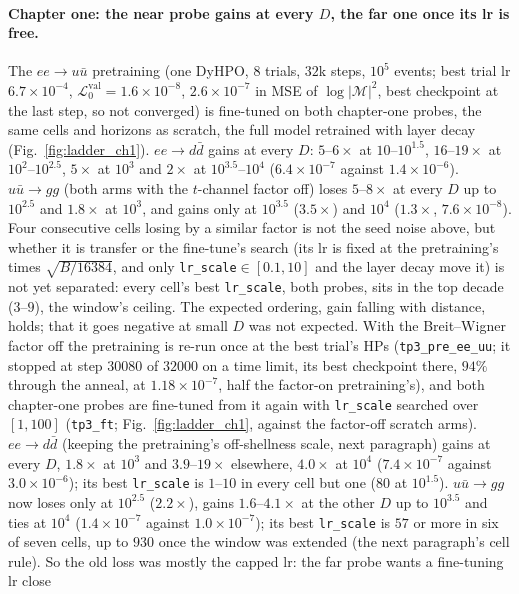 \documentclass[11pt]{article}
\newcommand{\vlnr}{\mathcal{L}^{\mathrm{val}}_{0}}   %
\newcommand{\code}[1]{\texttt{#1}}
\begin{document}
\paragraph{Chapter one: the near probe gains at every $D$, the far one once its lr is free.} The $ee\to u\bar u$
pretraining (one DyHPO, $8$ trials, $32$k steps, $10^5$ events; best trial lr
$6.7\times10^{-4}$, $\vlnr=1.6\times10^{-8}$, $2.6\times10^{-7}$ in MSE of $\log|\mathcal M|^2$,
best checkpoint at the last step, so not converged) is fine-tuned on both chapter-one probes, the same cells and
horizons as scratch, the full model retrained with layer decay (Fig.~\ref{fig:ladder_ch1}).
$ee\to d\bar d$ gains at every $D$: $5$--$6\times$ at $10$--$10^{1.5}$, $16$--$19\times$ at
$10^2$--$10^{2.5}$, $5\times$ at $10^3$ and $2\times$ at $10^{3.5}$--$10^4$ ($6.4\times10^{-7}$
against $1.4\times10^{-6}$). $u\bar u\to gg$ (both arms with the $t$-channel factor off) loses
$5$--$8\times$ at every $D$ up to $10^{2.5}$ and $1.8\times$ at $10^3$, and gains only at
$10^{3.5}$ ($3.5\times$) and $10^4$ ($1.3\times$, $7.6\times10^{-8}$). Four consecutive cells
losing by a similar factor is not the seed noise above, but whether it is transfer or the
fine-tune's search (its lr is fixed at the pretraining's times $\sqrt{B/16384}$, and only
\code{lr\_scale}$\in[0.1,10]$ and the layer decay move it) is not yet separated: every cell's best
\code{lr\_scale}, both probes, sits in the top decade ($3$--$9$), the window's ceiling. The expected
ordering, gain falling with distance, holds; that it goes negative at small $D$ was not expected. With
the Breit--Wigner factor off the pretraining is re-run once at the best trial's HPs
(\code{tp3\_pre\_ee\_uu}; it stopped at step $30080$ of $32000$ on a time limit, its best checkpoint there,
$94\%$ through the anneal, at $1.18\times10^{-7}$, half the factor-on pretraining's), and both chapter-one
probes are fine-tuned from it again with \code{lr\_scale} searched over $[1,100]$ (\code{tp3\_ft};
Fig.~\ref{fig:ladder_ch1}, against the factor-off scratch arms). $ee\to d\bar d$ (keeping the pretraining's
off-shellness scale, next paragraph) gains at every $D$, $1.8\times$ at $10^3$ and $3.9$--$19\times$ elsewhere, $4.0\times$ at $10^4$
($7.4\times10^{-7}$ against $3.0\times10^{-6}$); its best \code{lr\_scale} is $1$--$10$ in every cell but one ($80$ at
$10^{1.5}$). $u\bar u\to gg$ now loses only at $10^{2.5}$ ($2.2\times$), gains $1.6$--$4.1\times$ at the other $D$ up
to $10^{3.5}$ and ties at $10^4$ ($1.4\times10^{-7}$ against $1.0\times10^{-7}$); its best \code{lr\_scale} is $57$ or
more in six of seven cells, up to $930$ once the window was extended (the next paragraph's cell rule). So the old loss was mostly the capped lr: the far probe wants a fine-tuning lr close
\end{document}
